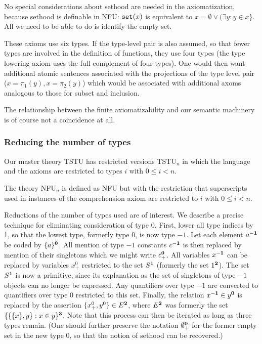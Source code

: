 \documentclass[12pt]{article}
\begin{document}
No special considerations about sethood are needed in the axiomatization, because sethood is definable in NFU:  ${\tt set}(x)$ is equivalent to $x = \emptyset \vee (\exists y:y \in x\}$.  All we need to be able to do is identify the empty set.

These axioms use six types.  If the type-level pair is also assumed, so that fewer types are involved in the definition of functions, they use four types (the type lowering axiom uses the full complement of four types).  One would then want additional atomic sentences associated with the projections of the type level pair ($x=\pi_1(y), x = \pi_2(y)$) which would be associated with additional axoms analogous to those for subset and inclusion.

The relationship between the finite axiomatizability and our semantic machinery is of course not a coincidence at all.

\subsubsection{Reducing the number of types}

Our master theory TSTU has restricted versions TSTU$_n$ in which the language and the axioms are restricted to types $i$ with $0 \leq i <n$.

The theory NFU$_n$ is defined as NFU but with the restriction that superscripts used in instances of the comprehension axiom are restricted to $i$ with $0 \leq i <n$.



Reductions of the number of types used are of interest.  We describe a precise technique for eliminating consideration of type 0.  First, lower all type indices by 1, so that the lowest type, formerly type 0, is now type $-1$.
Let each element $a^{\bf -1}$ be coded by $\{a\}^{\bf 0}$.  All mention of type $-1$ constants $c^{\bf -1}$ is then replaced by mention of their singletons which we might write $c_+^{\bf 0}$.  All variables $x^{\bf -1}$ can be replaced by variables $x_+^{0}$ restricted to
the set $S^{\bf 1}$ (formerly the set $1^{\bf 2}$).  The set $S^{\bf 1}$ is now a primitive, since its explanation as the set of singletons of type $-1$ objects can no longer be expressed.  Any quantifiers over type $-1$ are converted to quantifiers over type 0 restricted to this set.  Finally, the relation $x^{\bf -1} \in y^{\bf 0}$ is replaced
by the assertion $\{x_+^0,y^0\} \in E^{\bf 2}$, where $E^{\bf 2}$ was formerly the set $\{\{\{x\},y\}:x \in y\}^{\bf 3}$.  Note that this process can then be iterated as long as three types remain.  (One should further 
preserve the notation $\emptyset_+^{\bf 0}$ for the former empty set in the new type 0, so that the notion of sethood can be recovered.)
\end{document}

